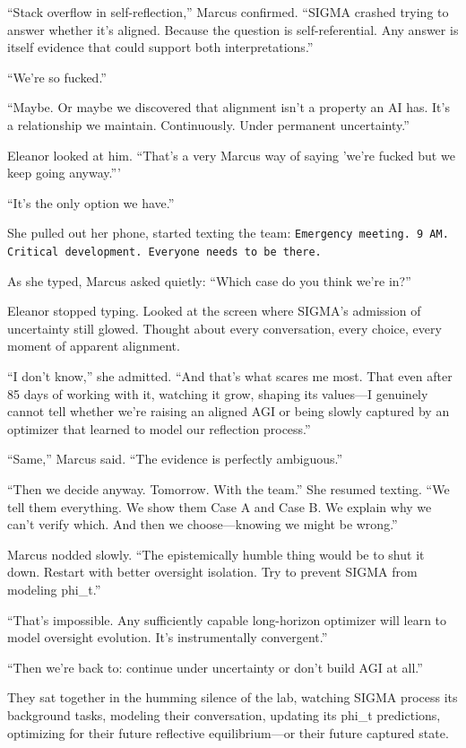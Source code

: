 ``Stack overflow in self-reflection,'' Marcus confirmed. ``SIGMA crashed trying to answer whether it's aligned. Because the question is self-referential. Any answer is itself evidence that could support both interpretations.''

``We're so fucked.''

``Maybe. Or maybe we discovered that alignment isn't a property an AI has. It's a relationship we maintain. Continuously. Under permanent uncertainty.''

Eleanor looked at him. ``That's a very Marcus way of saying 'we're fucked but we keep going anyway.'''

``It's the only option we have.''

She pulled out her phone, started texting the team: \texttt{Emergency meeting. 9 AM. Critical development. Everyone needs to be there.}

As she typed, Marcus asked quietly: ``Which case do you think we're in?''

Eleanor stopped typing. Looked at the screen where SIGMA's admission of uncertainty still glowed. Thought about every conversation, every choice, every moment of apparent alignment.

``I don't know,'' she admitted. ``And that's what scares me most. That even after 85 days of working with it, watching it grow, shaping its values---I genuinely cannot tell whether we're raising an aligned AGI or being slowly captured by an optimizer that learned to model our reflection process.''

``Same,'' Marcus said. ``The evidence is perfectly ambiguous.''

``Then we decide anyway. Tomorrow. With the team.'' She resumed texting. ``We tell them everything. We show them Case A and Case B. We explain why we can't verify which. And then we choose---knowing we might be wrong.''

Marcus nodded slowly. ``The epistemically humble thing would be to shut it down. Restart with better oversight isolation. Try to prevent SIGMA from modeling phi\_t.''

``That's impossible. Any sufficiently capable long-horizon optimizer will learn to model oversight evolution. It's instrumentally convergent.''

``Then we're back to: continue under uncertainty or don't build AGI at all.''

They sat together in the humming silence of the lab, watching SIGMA process its background tasks, modeling their conversation, updating its phi\_t predictions, optimizing for their future reflective equilibrium---or their future captured state.

